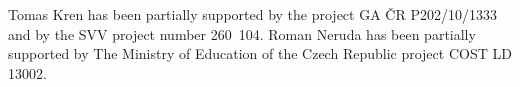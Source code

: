 \documentclass{sig-alternate}
\begin{document}
Tomas Kren
has been partially supported by the project GA \v{C}R P202/10/1333 and by the SVV project number 260~104. Roman Neruda has been partially supported by The Ministry of Education of the Czech Republic project COST LD 13002.


%
%


\end{document}
